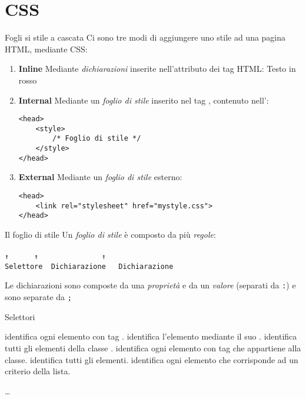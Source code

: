\section{CSS}
\begin{frame}[fragile]{Fogli si stile a cascata}\transfade\centering
  Ci sono tre modi di aggiungere uno stile ad una pagina HTML, mediante CSS:
  \begin{enumerate}[<+(1)->]
    \item \textbf{Inline} Mediante \emph{dichiarazioni} inserite nell'attributo  dei tag HTML:
     {\color{red}Testo in rosso}
    \item \textbf{Internal} Mediante un \emph{foglio di stile} inserito nel tag , contenuto nell':
    \begin{verbatim}
<head>
    <style>
        /* Foglio di stile */
    </style>
</head>
    \end{verbatim}
    \item \textbf{External} Mediante un \emph{foglio di stile} esterno:
    \begin{verbatim}
<head>
    <link rel="stylesheet" href="mystyle.css">
</head>
    \end{verbatim}
  \end{enumerate}
\end{frame}

\begin{frame}[fragile]{Il foglio di stile}\transfade\centering
  Un \emph{foglio di stile} è composto da più \emph{regole}:\\\medskip
     \\
      \texttt{↑~~~~~~↑~~~~~~~~~~~~~~~↑~~~~~~}\\
\texttt{Selettore~~Dichiarazione~~~Dichiarazione~~}\par\bigskip
  Le dichiarazioni sono composte da una \emph{proprietà} e da un \emph{valore} (separati da \texttt{:}) e sono separate da \texttt{;}\\
\end{frame}

\begin{frame}[fragile]{Selettori}\transfade\centering
  \begin{description}[<+->]
    \itemtt[\mintcss{p}] identifica ogni elemento con tag .
    \itemtt[\#id] identifica l'elemento mediante il suo .
     identifica tutti gli elementi della classe .
     identifica ogni elemento con tag  che appartiene alla classe.
    \itemtt[*] identifica tutti gli elementi.
     identifica ogni elemento che corrisponde ad un criterio della lista.
  \end{description}
  \dots\\
\end{frame}

